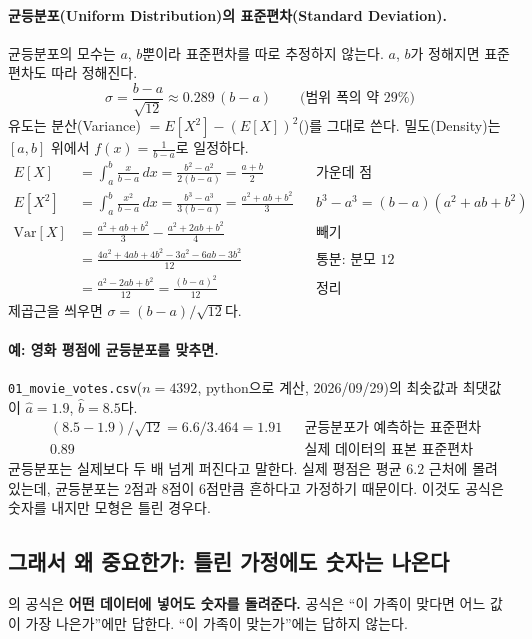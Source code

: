 \documentclass[11pt]{article}
\newcommand{\term}[1]{\textbf{#1}}
\begin{document}
\paragraph{균등분포(Uniform Distribution)의 표준편차(Standard Deviation).}
균등분포의 모수는 $a$, $b$뿐이라 표준편차를 따로 추정하지 않는다. $a$, $b$가 정해지면
표준편차도 따라 정해진다.
\[
  \sigma = \frac{b-a}{\sqrt{12}} \approx 0.289\,(b-a)
  \qquad \text{(범위 폭의 약 $29\%$)}
\]
유도는 분산(Variance) $= E[X^2] - (E[X])^2$()를 그대로 쓴다.
밀도(Density)는 $[a, b]$ 위에서 $f(x) = \frac{1}{b-a}$로 일정하다.
\begin{align*}
  E[X] &= \int_a^b \frac{x}{b-a}\,dx = \frac{b^2 - a^2}{2(b-a)} = \frac{a+b}{2}
    && \text{가운데 점}\\
  E[X^2] &= \int_a^b \frac{x^2}{b-a}\,dx = \frac{b^3 - a^3}{3(b-a)} = \frac{a^2 + ab + b^2}{3}
    && \text{$b^3 - a^3 = (b-a)(a^2+ab+b^2)$}\\
  \mathrm{Var}[X] &= \frac{a^2 + ab + b^2}{3} - \frac{a^2 + 2ab + b^2}{4}
    && \text{빼기}\\
  &= \frac{4a^2 + 4ab + 4b^2 - 3a^2 - 6ab - 3b^2}{12}
    && \text{통분: 분모 $12$}\\
  &= \frac{a^2 - 2ab + b^2}{12} = \frac{(b-a)^2}{12}
    && \text{정리}
\end{align*}
제곱근을 씌우면 $\sigma = (b-a)/\sqrt{12}$다.

\paragraph{예: 영화 평점에 균등분포를 맞추면.}
\texttt{01\_movie\_votes.csv}($n = 4392$, python으로 계산, 2026/09/29)의 최솟값과 최댓값이
$\hat a = 1.9$, $\hat b = 8.5$다.
\begin{align*}
  &(8.5 - 1.9)/\sqrt{12} = 6.6 / 3.464 = 1.91 && \text{균등분포가 예측하는 표준편차}\\
  &0.89 && \text{실제 데이터의 표본 표준편차}
\end{align*}
균등분포는 실제보다 두 배 넘게 퍼진다고 말한다. 실제 평점은 평균 $6.2$ 근처에 몰려
있는데, 균등분포는 $2$점과 $8$점이 $6$점만큼 흔하다고 가정하기 때문이다. 이것도
공식은 숫자를 내지만 모형은 틀린 경우다.

\subsection{그래서 왜 중요한가: 틀린 가정에도 숫자는 나온다}
의 공식은 \term{어떤 데이터에 넣어도 숫자를 돌려준다.}
공식은 ``이 가족이 맞다면 어느 값이 가장 나은가''에만 답한다. ``이 가족이 맞는가''에는
답하지 않는다.
\end{document}
